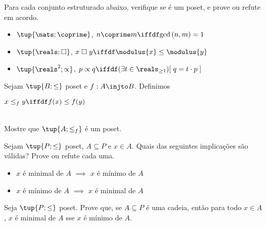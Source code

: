 \begin{exercise}
	
	Para cada conjunto estruturado abaixo, verifique se é um poset, e prove ou refute em acordo.

	\begin{itemize}
		\item $\tup{\nats; \coprime}$, $n \coprime m \iffdf \mathrm{gcd}\left(n, m\right) = 1$  
		\item $\tup{\reals; \square}$, $x \mathrel{\square} y \iffdf \modulus{x} \leq \modulus{y}$
		\item $\tup{\reals^2; \propto}$, $p \propto q \iffdf (\exists t \in \reals_{\geq 1}) [\;q = t \cdot p\;]$ 
	\end{itemize}
\end{exercise}

\begin{exercise}
	
	Sejam $\tup{B; \leq}$ poset e $f : A \injto B$. Definimos \\ \centerline{$x \leq_f y \iffdf f(x) \leq f(y)$}
	\\ Mostre que $\tup{A; \leq_f}$ é um poset.
\end{exercise}

\begin{exercise}
	
	Sejam $\tup{P; \leq}$ poset, $A \subseteq P$ e $x \in A$.
	Quais das seguintes implicações são válidas? Prove ou refute cada uma.
	\begin{itemize}
		\item $x$ é minimal de $A$ $\implies$ $x$ é mínimo de $A$
		\item $x$ é mínimo de $A$ $\implies$ $x$ é minimal de $A$
	\end{itemize}
\end{exercise}

\begin{homework}

	Seja $\tup{P; \leq}$ poset. Prove que, se $A \subseteq P$ é uma cadeia, então para todo $x \in A$, $x$ é minimal de $A$ sse $x$ é mínimo de $A$. 
\end{homework}
